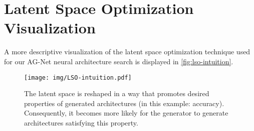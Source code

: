 \documentclass[runningheads]{llncs}
\begin{document}
\section{Latent Space Optimization Visualization}\label{sec:lso_intuition}
A more descriptive visualization of the latent space optimization technique used for our AG-Net neural architecture search is displayed in \autoref{fig:lso-intuition}.

\begin{figure*}[h]
	\centering
	\texttt{[image: img/LSO-intuition.pdf]}
	
	\caption{
		The latent space is reshaped in a way that promotes desired properties of generated architectures (in this example: accuracy).
		Consequently, it becomes more likely for the generator to generate architectures satisfying this property.
	}
	\label{fig:lso-intuition}
\end{figure*}
\end{document}
